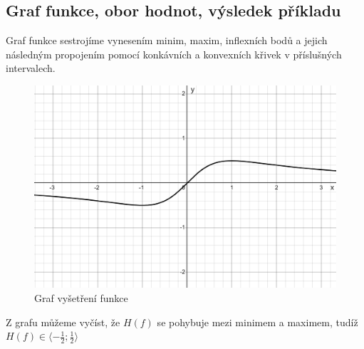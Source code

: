 \subsection{Graf funkce, obor hodnot, výsledek příkladu}
Graf funkce sestrojíme vynesením minim, maxim, inflexních bodů a jejich následným propojením pomocí konkávních a konvexních křivek v příslušných intervalech.

\begin{figure}[H]
        \centering
        \includegraphics[width=0.8\linewidth]{img/18_graf_po_vysetreni.png}
        \caption{Graf vyšetření funkce} 
        \label{fig:enter-label}
    \end{figure}

Z grafu můžeme vyčíst, že $H(f)$ se pohybuje mezi minimem a maximem, tudíž $H(f) \in \langle -\frac{1}{2}; \frac{1}{2} \rangle$



